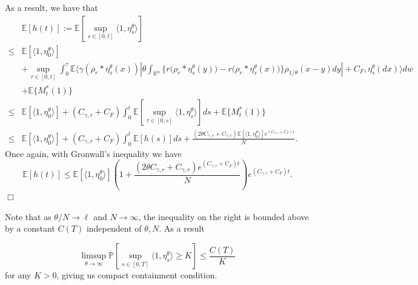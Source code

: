 \documentclass[12pt]{article}
\newenvironment {proof}{{\noindent\bf Proof }}{\hfill $\Box$ \medskip}
\begin{document}
\begin{proof}
As a result, we have that 
\begin{equation}\label{eq: Total mass control supremum control}
\begin{aligned}
&\mathbb{E}[h(t)]:=\mathbb{E}\left[\sup_{s \in [0,t]}\langle 1 ,\eta^{\theta}_{s}\rangle\right] \\
\leq &  \mathbb{E}[\langle 1 ,\eta^{\theta}_{0}\rangle] \\
&+ \sup_{\tau \in [0,t]} \int_{0}^{\tau}\mathbb{E} \bigg\langle \gamma(\rho_{r}*\eta^{\theta}_{s}(x)) \left| \theta \int_{\mathbb{R}^n} \big\{r\big(\rho_{r}*\eta^{\theta}_{s}(y)\big)-r\big(\rho_{r}*\eta^{\theta}_{s}(x)\big)\big\}\rho_{1/\theta}(x-y)dy\right| + C_F ,\eta^{\theta}_{s}(dx)  \bigg\rangle dw\\
&+ \mathbb{E}\{M^{*}_t(1)\}\\
\leq &  \mathbb{E}[\langle 1 ,\eta^{\theta}_{0}\rangle] + (C_{\gamma,r} + C_F)\int_{0}^{t}\mathbb{E} \left[ \sup_{\tau \in [0,s]} \langle 1  ,\eta^{\theta}_{s} \rangle \right]ds+\mathbb{E}\{M^{*}_t(1)\}\\
\leq &  \mathbb{E}[\langle 1 ,\eta^{\theta}_{0}\rangle] + (C_{\gamma,r} + C_F)\int_{0}^{t}\mathbb{E} \left[ h(s) \right]ds+\frac{(2 \theta C_{\gamma,r}+C_{\gamma,r})\mathbb{E}[\langle 1 ,\eta^{\theta}_{0}\rangle]e^{(C_{\gamma,r}+C_F)t}}{N}.
\end{aligned}
\end{equation}
Once again, with Gronwall's inequality we have 
\begin{equation}
\mathbb{E}[h(t)] 
\leq   \mathbb{E}[\langle 1 ,\eta^{\theta}_{0}\rangle]
            \left(1+\frac{(2 \theta C_{\gamma,r}+C_{\gamma,r})e^{(C_{\gamma,r}+C_F)t}}{N}\right)e^{(C_{\gamma,r}+C_F)t}.  
\end{equation}
\end{proof}

Note that as $\theta/N \to \ell$ and $N \to \infty$,
the inequality on the right is bounded above by a constant $C(T)$
independent of $\theta, N$.
As a result 

\begin{equation}
\limsup_{\theta \to \infty}\mathbb{P}\left[\sup_{s \in [0,T]}\langle 1 ,\eta^{\theta}_{s}\rangle \geq K\right] \leq \frac{C(T)}{K}    
\end{equation}
for any $K > 0$, giving us compact containment condition.    
\end{document}
